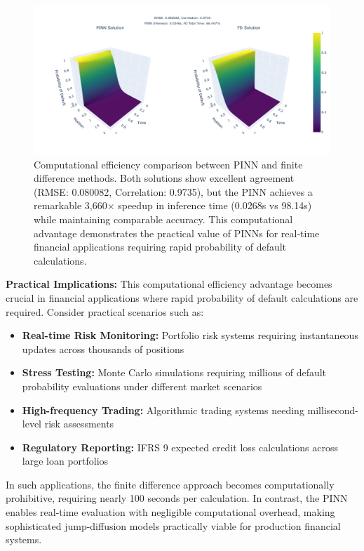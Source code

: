 \documentclass[11pt,twoside,openright]{report}
\begin{document}
\begin{figure}[htbp]
    \centering
    \includegraphics[width=\textwidth]{Figures/comparison_side_by_side.png}
    \caption{Computational efficiency comparison between PINN and finite difference methods. Both solutions show excellent agreement (RMSE: 0.080082, Correlation: 0.9735), but the PINN achieves a remarkable 3,660× speedup in inference time (0.0268s vs 98.14s) while maintaining comparable accuracy. This computational advantage demonstrates the practical value of PINNs for real-time financial applications requiring rapid probability of default calculations.}
    \label{fig:pinn_fd_comparison}
\end{figure}

\textbf{Practical Implications:} This computational efficiency advantage becomes crucial in financial applications where rapid probability of default calculations are required. Consider practical scenarios such as:
\begin{itemize}
    \item \textbf{Real-time Risk Monitoring:} Portfolio risk systems requiring instantaneous updates across thousands of positions
    \item \textbf{Stress Testing:} Monte Carlo simulations requiring millions of default probability evaluations under different market scenarios  
    \item \textbf{High-frequency Trading:} Algorithmic trading systems needing millisecond-level risk assessments
    \item \textbf{Regulatory Reporting:} IFRS 9 expected credit loss calculations across large loan portfolios
\end{itemize}

In such applications, the finite difference approach becomes computationally prohibitive, requiring nearly 100 seconds per calculation. In contrast, the PINN enables real-time evaluation with negligible computational overhead, making sophisticated jump-diffusion models practically viable for production financial systems.
\end{document}
